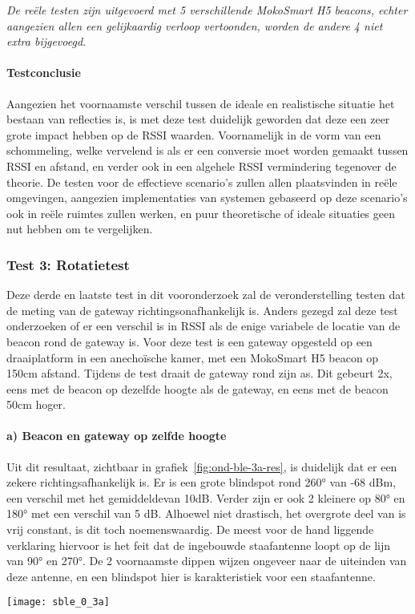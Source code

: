 \emph{De reële testen zijn uitgevoerd met 5 verschillende MokoSmart H5 beacons, echter aangezien allen een gelijkaardig verloop vertoonden, worden de andere 4 niet extra bijgevoegd.}

\paragraph{Testconclusie}
Aangezien het voornaamste verschil tussen de ideale en realistische situatie het bestaan van reflecties is, is met deze test duidelijk geworden dat deze een zeer grote impact hebben op de RSSI waarden. Voornamelijk in de vorm van een schommeling, welke vervelend is als er een conversie moet worden gemaakt tussen RSSI en afstand, en verder ook in een algehele RSSI vermindering tegenover de theorie. 
De testen voor de effectieve scenario's zullen allen plaatsvinden in reële omgevingen, aangezien implementaties van systemen gebaseerd op deze scenario's ook in reële ruimtes zullen werken, en puur theoretische of ideale situaties geen nut hebben om te vergelijken.

\subsubsection{Test 3: Rotatietest}
\label{sec:ond-ble-0-3}
Deze derde en laatste test in dit vooronderzoek zal de veronderstelling testen dat de meting van de gateway richtingsonafhankelijk is. Anders gezegd zal deze test onderzoeken of er een verschil is in RSSI als de enige variabele de locatie van de beacon rond de gateway is.
Voor deze test is een gateway opgesteld op een draaiplatform in een anechoïsche kamer, met een MokoSmart H5 beacon op 150cm afstand. Tijdens de test draait de gateway rond zijn as. Dit gebeurt 2x, eens met de beacon op dezelfde hoogte als de gateway, en eens met de beacon 50cm hoger.

\paragraph{a) Beacon en gateway op zelfde hoogte}
\begin{minipage}{0.55\textwidth}
Uit dit resultaat, zichtbaar in grafiek~\ref{fig:ond-ble-3a-res}, is duidelijk dat er een zekere richtingsafhankelijk is. Er is een grote blindspot rond 260° van -68 dBm, een verschil met het gemiddelde\footnotemark van 10dB. Verder zijn er ook 2 kleinere op 80° en 180° met een verschil van 5 dB. Alhoewel niet drastisch, het overgrote deel van is vrij constant, is dit toch noemenswaardig. De meest voor de hand liggende verklaring hiervoor is het feit dat de ingebouwde staafantenne loopt op de lijn van 90° en 270°. De 2 voornaamste dippen wijzen ongeveer naar de uiteinden van deze antenne, en een blindspot hier is karakteristiek voor een staafantenne.
\end{minipage}
\hfill
\begin{minipage}{0.42\textwidth}
	\texttt{[image: sble\_0\_3a]}
	\label{fig:ond-ble-3a-res}
\end{minipage}


